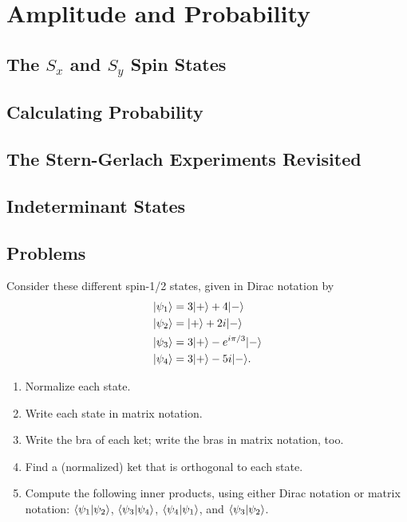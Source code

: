 \chapter{Amplitude and Probability}

\section{The $S_x$ and $S_y$ Spin States}

\section{Calculating Probability}

\section{The Stern-Gerlach Experiments Revisited}

\section{Indeterminant States}

\section*{Problems}
%

\begin{problem}
Consider these different spin-1/2 states, given in Dirac notation by
\begin{align*}
| \psi_1 \rangle &= 3 | + \rangle + 4| - \rangle \\
| \psi_2 \rangle &= | + \rangle + 2i | - \rangle \\
| \psi_3 \rangle &= 3 | + \rangle - e^{i\pi/3}| - \rangle \\
| \psi_4 \rangle &= 3 | + \rangle - 5i| - \rangle.
\end{align*}
\begin{enumerate}[label=(\alph*)]
\item Normalize each state.
\item Write each state in matrix notation.
\item Write the bra of each ket; write the bras in matrix notation, too.
\item Find a (normalized) ket that is orthogonal to each state.
\item Compute the following inner products, using either Dirac notation or matrix notation:  $\langle \psi_1 | \psi_2 \rangle$, $\langle \psi_3 | \psi_4 \rangle$, $\langle \psi_4 | \psi_1 \rangle$, and $\langle \psi_3 | \psi_2 \rangle$.
\end{enumerate}
\end{problem}


